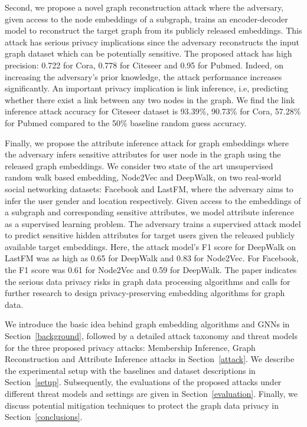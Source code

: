 Second, we propose a novel graph reconstruction attack where the adversary, given access to the node embeddings of a subgraph, trains an encoder-decoder model to reconstruct the target graph from its publicly released embeddings.
This attack has serious privacy implications since the adversary reconstructs the input graph dataset which can be potentially sensitive.
The proposed attack has high precision: 0.722 for Cora, 0.778 for Citeseer and 0.95 for Pubmed.
Indeed, on increasing the adversary's prior knowledge, the attack performance increases significantly.
An important privacy implication is link inference, i.e, predicting whether there exist a link between any two nodes in the graph.
We find the link inference attack accuracy for Citeseer dataset is 93.39\%, 90.73\% for Cora, 57.28\% for Pubmed compared to the 50\% baseline random guess accuracy.


Finally, we propose the attribute inference attack for graph embeddings where the adversary infers sensitive attributes for user node in the graph using the released graph embeddings.
We consider two state of the art unsupervised random walk based embedding, Node2Vec and DeepWalk, on two real-world social networking datasets: Facebook and LastFM, where the adversary aims to infer the user gender and location respectively.
Given access to the embeddings of a subgraph and corresponding sensitive attributes, we model attribute inference as a supervised learning problem.
The adversary trains a supervised attack model to predict sensitive hidden attributes for target users given the released publicly available target embeddings.
Here, the attack model's F1 score for DeepWalk on LastFM was as high as 0.65 for DeepWalk and 0.83 for Node2Vec. For Facebook, the F1 score was 0.61 for Node2Vec and 0.59 for DeepWalk.
The paper indicates the serious data privacy risks in graph data processing algorithms and calls for further research to design privacy-preserving embedding algorithms for graph data.

We introduce the basic idea behind graph embedding algorithms and GNNs in Section~\ref{background}, followed by a detailed attack taxonomy and threat models for the three proposed privacy attacks: Membership Inference, Graph Reconstruction and Attribute Inference attacks in Section~\ref{attack}.
We describe the experimental setup with the baselines and dataset descriptions in Section~\ref{setup}.
Subsequently, the evaluations of the proposed attacks under different threat models and settings are given in Section~\ref{evaluation}.
Finally, we discuss potential mitigation techniques to protect the graph data privacy in Section~\ref{conclusions}.
